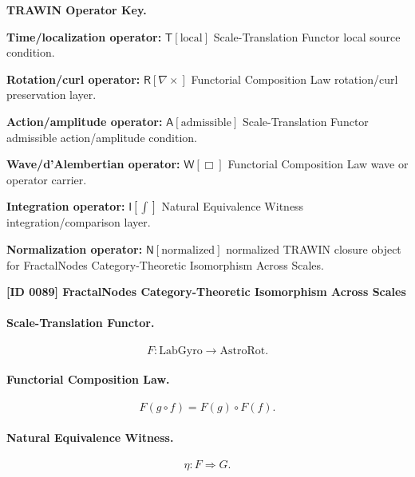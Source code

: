 \par\vspace{0.45\baselineskip}
\noindent\begin{minipage}[t]{\linewidth}
\begingroup
\small
\raggedright
\textbf{TRAWIN Operator Key.}\par
\noindent\textbf{Time/localization operator:} $\mathsf{T}\!\left[\mathrm{local}\right]$ Scale-Translation Functor local source condition.\par
\noindent\textbf{Rotation/curl operator:} $\mathsf{R}\!\left[\nabla\times\right]$ Functorial Composition Law rotation/curl preservation layer.\par
\noindent\textbf{Action/amplitude operator:} $\mathsf{A}\!\left[\mathrm{admissible}\right]$ Scale-Translation Functor admissible action/amplitude condition.\par
\noindent\textbf{Wave/d'Alembertian operator:} $\mathsf{W}\!\left[\Box\right]$ Functorial Composition Law wave or operator carrier.\par
\noindent\textbf{Integration operator:} $\mathsf{I}\!\left[\int\right]$ Natural Equivalence Witness integration/comparison layer.\par
\noindent\textbf{Normalization operator:} $\mathsf{N}\!\left[\mathrm{normalized}\right]$ normalized TRAWIN closure object for FractalNodes Category-Theoretic Isomorphism Across Scales.\par
\endgroup
\end{minipage}

\clearpage
\noindent\textbf{[ID 0089] FractalNodes Category-Theoretic Isomorphism Across Scales}\par
\vspace{0.35em}
\paragraph{Scale-Translation Functor.}
\begin{equation}
F:\mathrm{LabGyro}\longrightarrow\mathrm{AstroRot}.
\end{equation}

\paragraph{Functorial Composition Law.}
\begin{equation}
F(g\circ f)
=
F(g)\circ F(f).
\end{equation}

\paragraph{Natural Equivalence Witness.}
\begin{equation}
\eta:F\Rightarrow G .
\end{equation}

